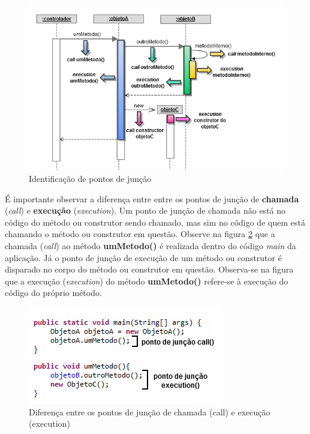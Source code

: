 \begin{figure}[!hb]
	\centering
	\includegraphics[scale=0.8]{img/aspects_join_point_model.png}
	\caption{Identificação de pontos de junção}\label{fig:aspects_join_point_model}
\end{figure}

É importante observar a diferença entre entre os pontos de junção de \textbf{chamada} (\textit{call}) e \textbf{execução} (\textit{execution}). Um
ponto de junção de chamada não está no código do método ou construtor sendo chamado, mas sim no código de quem está chamando o método ou construtor em
questão. Observe na figura \ref{fig:call_vs_execution} que a chamada (\textit{call}) ao método \textbf{umMetodo()} é realizada dentro do código
\textit{main} da aplicação. Já o ponto de junção de execução de um método ou construtor é disparado no corpo do método ou construtor em questão.
Observa-se na figura que a execução (\textit{execution}) do método \textbf{umMetodo()} refere-se à execução do código do próprio método.

\begin{figure}[!hb]
	\centering
	\includegraphics{img/call_vs_execution.png}
	\caption{Diferença entre os pontos de junção de chamada (call) e execução (execution)}\label{fig:call_vs_execution}
\end{figure}

